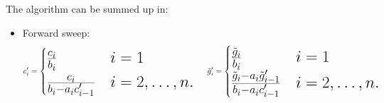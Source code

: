 \documentclass[10pt,a4paper,titlepage]{article}
\begin{document}
The algorithm can be summed up in:
\begin{itemize} 
\item Forward sweep:
\[\huge
	c'_i= \begin{cases} 
			\frac{c_i }{b_i }  & i=1 \\
			\frac{c_i}{b_i-a_i c'_{i-1}} & i=2,\dots,n. 
		\end{cases}
	\hspace{0.5cm}
	\tilde{g}'_i= \begin{cases} 
					\frac{\tilde{g}_i}{b_i}  & i=1 \\
					\frac{\tilde{g}_i- a_i \tilde{g}'_{i-1}}{b_i-a_i c'_{i-1}} & i=2,\dots,n. 
				\end{cases}
\]
\end{itemize}
\end{document}

